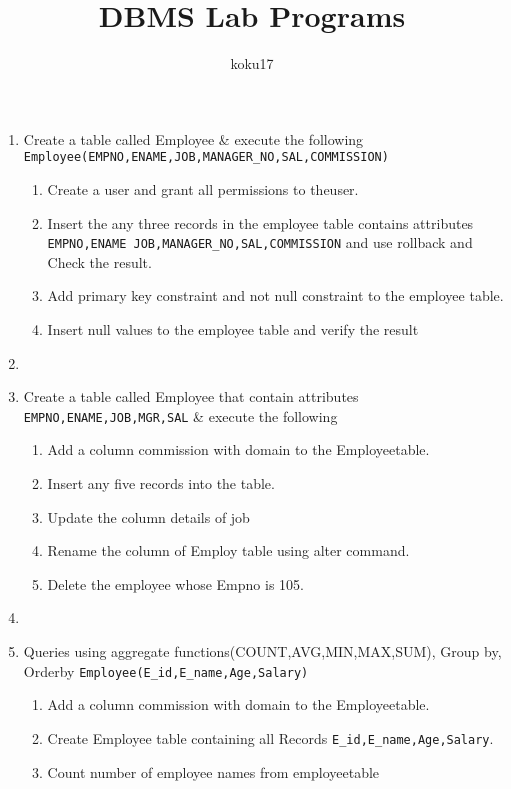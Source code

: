\documentclass{article}
\author{koku17}
\title{DBMS Lab Programs}
\date{}
\newcommand{\answer}{\item[$\rightarrow$]}
\begin{document}
	\maketitle \newpage
	\begin{enumerate}[label=\arabic*. ]
		\item Create a table called Employee \& execute the following \\
			\texttt{Employee(EMPNO,ENAME,JOB,MANAGER\_NO,SAL,COMMISSION)}
		\begin{enumerate}[label=\roman*) ]
			\item Create a user and grant all permissions to theuser.
			\item Insert the any three records in the employee table contains attributes \\
				\texttt{EMPNO,ENAME JOB,MANAGER\_NO,SAL,COMMISSION} and use rollback and
				Check the result.
			\item Add primary key constraint and not null constraint to the employee table.
			\item Insert null values to the employee table and verify the result
		\end{enumerate}
		\answer \inputminted{mysql}{../Lab1.sql} \newpage
		\item Create a table called Employee that contain attributes
			\texttt{EMPNO,ENAME,JOB,MGR,SAL} \& execute the following
		\begin{enumerate}[label=\alph*) ]
			\item Add a column commission with domain to the Employeetable.
			\item Insert any five records into the table.
			\item Update the column details of job
			\item Rename the column of Employ table using alter command.
			\item Delete the employee whose Empno is 105.
		\end{enumerate}
		\answer \inputminted{mysql}{../Lab2.sql} \newpage
		\item Queries using aggregate functions(COUNT,AVG,MIN,MAX,SUM), Group by, Orderby
			\texttt{Employee(E\_id,E\_name,Age,Salary)}
		\begin{enumerate}[label=\alph*) ]
			\item Add a column commission with domain to the Employeetable.
			\item Create Employee table containing all Records \texttt{E\_id,E\_name,Age,Salary}.
			\item Count number of employee names from employeetable

\end{enumerate}
\end{enumerate}
\end{document}
